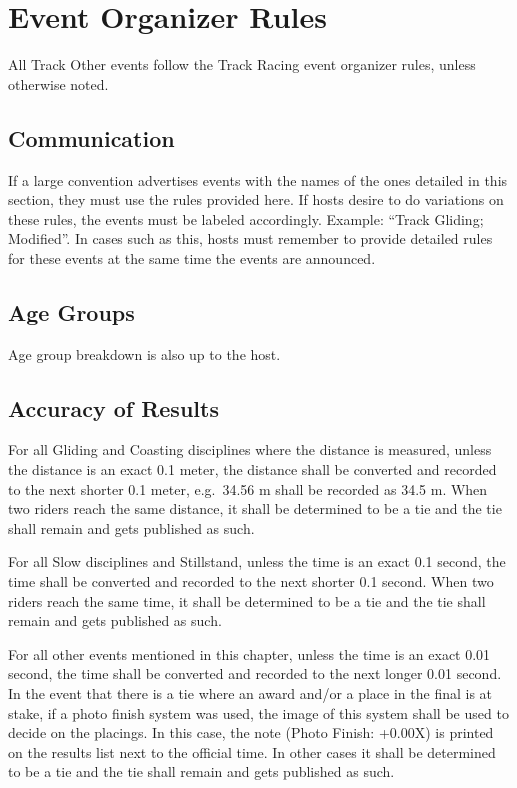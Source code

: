 \chapter{Event Organizer Rules}

All Track Other events follow the Track Racing event organizer rules, unless otherwise noted.

\section{Communication}

If a large convention advertises events with the names of the ones detailed in this section, they must use the rules provided here.
If hosts desire to do variations on these rules, the events must be labeled accordingly.
Example: ``Track Gliding; Modified''.
In cases such as this, hosts must remember to provide detailed rules for these events at the same time the events are announced.

\section{Age Groups}

Age group breakdown is also up to the host.

\section{Accuracy of Results}

For all Gliding and Coasting disciplines where the distance is measured, unless the distance is an exact 0.1 meter, the distance shall be converted and recorded to the next shorter 0.1 meter, e.g.\ 34.56 m shall be recorded as 34.5 m.
When two riders reach the same distance, it shall be determined to be a tie and the tie shall remain and gets published as such.

For all Slow disciplines and Stillstand, unless the time is an exact 0.1 second, the time shall be converted and recorded to the next shorter 0.1 second.
When two riders reach the same time, it shall be determined to be a tie and the tie shall remain and gets published as such.

For all other events mentioned in this chapter, unless the time is an exact 0.01 second, the time shall be converted and recorded to the next longer 0.01 second.
In the event that there is a tie where an award and/or a place in the final is at stake, if a photo finish system was used, the image of this system shall be used to decide on the placings.
In this case, the note (Photo Finish: +0.00X) is printed on the results list next to the official time. In other cases it shall be determined to be a tie and the tie shall remain and gets published as such.

